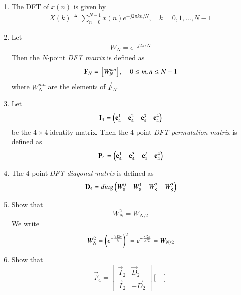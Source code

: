 \documentclass[journal,12pt,twocolumn]{IEEEtran}
\renewcommand\thesection{\arabic{section}}
\begin{document}
\begin{enumerate}[label=\arabic*.,ref=\thesection.\theenumi]
    \item The DFT of $x(n)$ is given by
    \begin{align}
        X(k) \triangleq \sum_{n=0}^{N-1} x(n) e^{-j 2 \pi k n / N}, \quad k=0,1, \ldots, N-1
    \end{align}
\item Let 
	\begin{align}
W_{N} = e^{-j2\pi/N} 
	\end{align}
		Then the $N$-point {\em DFT matrix} is defined as 
	\begin{align}
		\mathbf{F}_{N} = {}\left[W_{N}^{mn}\right], \quad 0 \le m,n \le N-1 
	\end{align}
	where $W_{N}^{mn}$ are the elements of $\vec{F}_{N}$.
\item Let 
	\begin{align}
		\mathbf{I}_4 = \begin{pmatrix}\mathbf{e}_4^{1} &\mathbf{e}_4^{2} &\mathbf{e}_4^{3} &\mathbf{e}_4^{4} \end{pmatrix}
	\end{align}
		be the $4\times 4$ identity matrix.  Then the 4 point {\em DFT permutation matrix} is defined as 
	\begin{align}
		\mathbf{P}_4 = \begin{pmatrix}\mathbf{e}_4^{1} &\mathbf{e}_4^{3} &\mathbf{e}_4^{2} &\mathbf{e}_4^{4} \end{pmatrix}
	\end{align}
\item The 4 point {\em DFT diagonal matrix} is defined as 
	\begin{align}
		\mathbf{D}_4 = diag\begin{pmatrix}W_{8}^{0} & W_{8}^{1} & W_{8}^{2} & W_{8}^{3}\end{pmatrix}
	\end{align}
\item Show that 
\begin{equation}
    W_{N}^{2}=W_{N/2}
    \label{eq:n-2}
\end{equation}
\solution We write
\begin{align}
	W_N^2 = \brak{e^{-\frac{\j2\pi}{N}}}^2 = e^{-\frac{\j2\pi}{N/2}} = W_{N/2}
\end{align}
    \item Show that 
\begin{equation}	
	\vec{F}_{4}=
\begin{bmatrix}
	\vec{I}_{2} & \vec{D}_{2} \\
\vec{I}_{2} & -\vec{D}_{2}
\end{bmatrix}
\begin{bmatrix}

\end{bmatrix}
\end{equation}
\end{enumerate}
\end{document}
